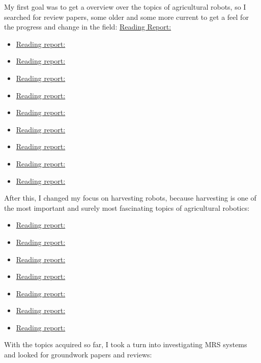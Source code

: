     My first goal was to get a overview over the topics of agricultural robots, so I searched for review papers, some older and some more current to get a feel for the progress and change in the field: 
    \hyperref[sec:]{Reading Report:} 
    \begin{itemize}
        \item \hyperref[sec:Bac2014]{Reading report:} \cite{Bac2014}
        \item \hyperref[sec:Bechar2016]{Reading report:} \cite{Bechar2016}
        \item \hyperref[sec:Davidson2020]{Reading report:} \cite{Davidson2020}
        \item \hyperref[sec:Haidegger2013]{Reading report:} \cite{Haidegger2013}
        \item \hyperref[sec:Pedersen2006]{Reading report:} \cite{Pedersen2006}
        \item \hyperref[sec:Roldan2016]{Reading report:} \cite{Roldan2016}
        \item \hyperref[sec:Siciliano2016]{Reading report:} \cite{Siciliano2016}
        \item \hyperref[sec:Thorpe2001]{Reading report:} \cite{Thorpe2001}
        \item \hyperref[sec:Zhao2016]{Reading report:} \cite{Zhao2016}
    \end{itemize}
    After this, I changed my focus on harvesting robots, because harvesting is one of the most important and surely most fascinating topics of agricultural robotics: 
    \begin{itemize}
        \item \hyperref[sec:Arad2020]{Reading report:} \cite{Arad2020}
        \item \hyperref[sec:Henten2003]{Reading report:} \cite{Henten2003}
        \item \hyperref[sec:Herck2020]{Reading report:} \cite{Herck2020}
        \item \hyperref[sec:Lehnert2020]{Reading report:} \cite{Lehnert2020}
        \item \hyperref[sec:Lili2017]{Reading report:} \cite{Lili2017}
        \item \hyperref[sec:Wu2020]{Reading report:} \cite{Wu2020}
        \item \hyperref[sec:Weiss2011]{Reading report:} \cite{Weiss2011}
    \end{itemize}
    With the topics acquired so far, I took a turn into investigating MRS systems and looked for groundwork papers and reviews: 
